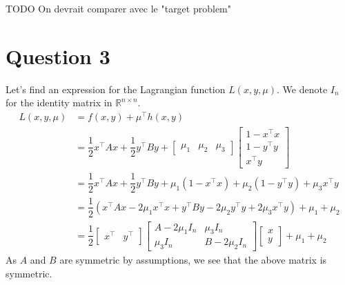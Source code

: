 \documentclass{article}
\newcommand{\R}{\mathbb{R}}
\newcommand{\tp}{^\top}
\newcommand{\fxy}{\dfrac{1}{2}x\tp A x + \dfrac{1}{2} y\tp B y}
\newcommand{\hxy}{\begin{bmatrix}
1-x\tp x\\
1-y\tp y\\
x\tp y
\end{bmatrix}}
\begin{document}
TODO On devrait comparer avec le "target problem"


\section*{Question 3}
Let's find an expression for the Lagrangian function $L(x,y,\mu)$. We denote $I_n$ for the identity matrix in $\R^{n\times n}$.
\begin{align*}
L(x,y,\mu) &= f(x,y)+\mu\tp h(x,y) \\
&=\fxy  + \begin{bmatrix} \mu_1 &\mu_2 & \mu_3 \end{bmatrix} \hxy \\
&=\fxy + \mu_1(1-x\tp x) +\mu_2(1-y\tp y) + \mu_3 x\tp y \\
&= \dfrac{1}{2}\left(x\tp A x - 2\mu_1 x\tp x +  y\tp B y -2\mu_2 y\tp y + 2\mu_3 x\tp y\right) + \mu_1+\mu_2 \\
&= \dfrac{1}{2} \begin{bmatrix} x\tp & y\tp\end{bmatrix}
\begin{bmatrix} A-2\mu_1 I_n & \mu_3 I_n \\
\mu_3 I_n & B-2\mu_2 I_n \end{bmatrix}
\begin{bmatrix} x \\ y \end{bmatrix} +\mu_1+\mu_2 
\end{align*}
As $A$ and $B$ are symmetric by assumptions, we see that the above matrix is symmetric.
\end{document}
